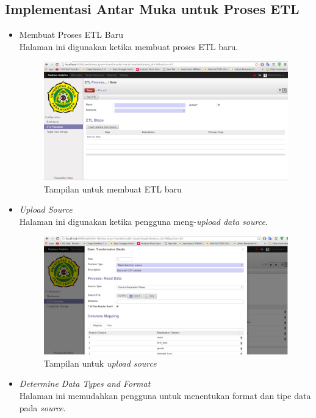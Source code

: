 	\subsection{Implementasi Antar Muka untuk Proses ETL}
	\begin{itemize}
		\item Membuat Proses ETL Baru\\
		Halaman ini digunakan ketika membuat proses ETL baru.
		\begin{figure}[H]
		\centering
		\includegraphics[scale=0.4]{Gambar/tampilan-etl-baru}
		\caption{Tampilan untuk membuat ETL baru}
		\end{figure}
		
		\item \textit{Upload Source}\\
		Halaman ini digunakan ketika pengguna meng-\textit{upload data source}.
		
		\begin{figure}[H]
		\centering
		\includegraphics[scale=0.4]{Gambar/tampilan-upload-source}
		\caption{Tampilan untuk \textit{upload source}}
		\end{figure}
		
		\item \textit{Determine Data Types and Format}\\
		Halaman ini memudahkan pengguna untuk menentukan format dan tipe data pada \textit{source}.
		

\end{itemize}
